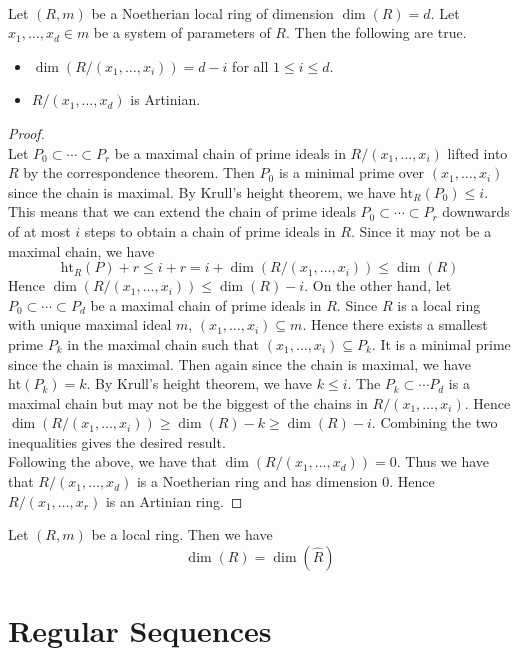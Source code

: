 \documentclass[a4paper]{article}
\begin{document}
\begin{prp}{}{}\\
Let $(R,m)$ be a Noetherian local ring of dimension $\dim(R)=d$. Let $x_1,\dots,x_d\in m$ be a system of parameters of $R$. Then the following are true. 
\begin{itemize}
\item $\dim(R/(x_1,\dots,x_i))=d-i$ for all $1\leq i\leq d$. 
\item $R/(x_1,\dots,x_d)$ is Artinian. 
\end{itemize}
\begin{proof}\\
Let $P_0\subset\cdots\subset P_r$ be a maximal chain of prime ideals in $R/(x_1,\dots,x_i)$ lifted into $R$ by the correspondence theorem. Then $P_0$ is a minimal prime over $(x_1,\dots,x_i)$ since the chain is maximal. By Krull's height theorem, we have $\text{ht}_R(P_0)\leq i$. This means that we can extend the chain of prime ideals $P_0\subset\cdots\subset P_r$ downwards of at most $i$ steps to obtain a chain of prime ideals in $R$. Since it may not be a maximal chain, we have $$\text{ht}_R(P)+r\leq i+r=i+\dim(R/(x_1,\dots,x_i))\leq\dim(R)$$ Hence $\dim(R/(x_1,\dots,x_i))\leq\dim(R)-i$. On the other hand, let $P_0\subset\cdots\subset P_d$ be a maximal chain of prime ideals in $R$. Since $R$ is a local ring with unique maximal ideal $m$, $(x_1,\dots,x_i)\subseteq m$. Hence there exists a smallest prime $P_k$ in the maximal chain such that $(x_1,\dots,x_i)\subseteq P_k$. It is a minimal prime since the chain is maximal. Then again since the chain is maximal, we have $\text{ht}(P_k)=k$. By Krull's height theorem, we have $k\leq i$. The $P_k\subset\cdots P_d$ is a maximal chain but may not be the biggest of the chains in $R/(x_1,\dots,x_i)$. Hence $\dim(R/(x_1,\dots,x_i))\geq\dim(R)-k\geq\dim(R)-i$. Combining the two inequalities gives the desired result. \\

Following the above, we have that $\dim(R/(x_1,\dots,x_d))=0$. Thus we have that $R/(x_1,\dots,x_d)$ is a Noetherian ring and has dimension $0$. Hence $R/(x_1,\dots,x_r)$ is an Artinian ring. 
\end{proof}
\end{prp}

\begin{prp}{}{} Let $(R,m)$ be a local ring. Then we have $$\dim(R)=\dim(\widehat{R})$$
\end{prp}

\pagebreak
\section{Regular Sequences}
\end{document}

